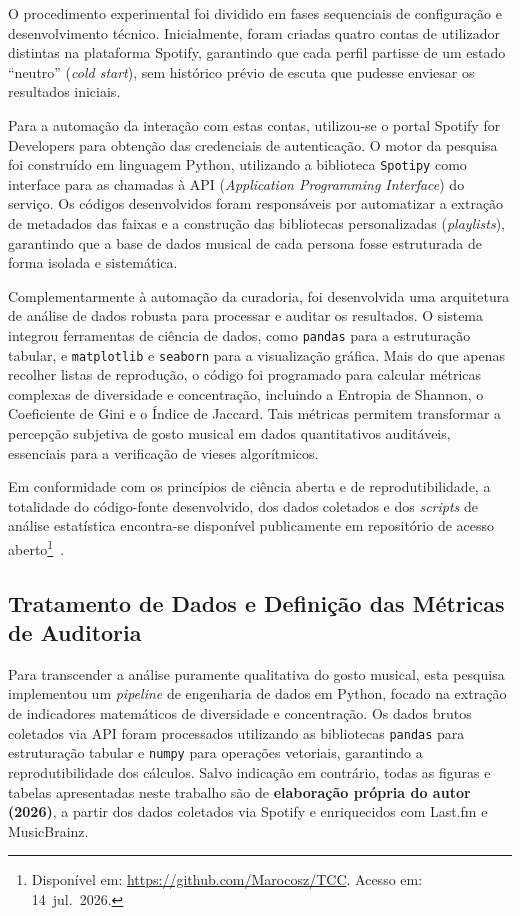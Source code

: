 \documentclass[12pt, %
openright,
oneside, %
a4paper,    %
english,   %
brazil]{facom-ufu-abntex2}
\begin{document}
O procedimento experimental foi dividido em fases sequenciais de configuração e
desenvolvimento técnico. Inicialmente, foram criadas quatro contas de utilizador
distintas na plataforma Spotify, garantindo que cada perfil partisse de um estado
``neutro'' (\emph{cold start}), sem histórico prévio de escuta que pudesse
enviesar os resultados iniciais.

Para a automação da interação com estas contas, utilizou-se o portal Spotify for
Developers para obtenção das credenciais de autenticação. O motor da pesquisa foi
construído em linguagem Python, utilizando a biblioteca \texttt{Spotipy} como
interface para as chamadas à API (\emph{Application Programming Interface}) do
serviço. Os códigos desenvolvidos foram responsáveis por automatizar a extração
de metadados das faixas e a construção das bibliotecas personalizadas
(\emph{playlists}), garantindo que a base de dados musical de cada persona fosse
estruturada de forma isolada e sistemática.

Complementarmente à automação da curadoria, foi desenvolvida uma arquitetura de
análise de dados robusta para processar e auditar os resultados. O sistema
integrou ferramentas de ciência de dados, como \texttt{pandas} para a
estruturação tabular, e \texttt{matplotlib} e \texttt{seaborn} para a
visualização gráfica. Mais do que apenas recolher listas de reprodução, o código
foi programado para calcular métricas complexas de diversidade e concentração, 
incluindo a Entropia de Shannon, o Coeficiente de Gini e o Índice de Jaccard.
Tais métricas permitem transformar a percepção subjetiva de gosto musical em
dados quantitativos auditáveis, essenciais para a verificação de vieses
algorítmicos.

Em conformidade com os princípios de ciência aberta e de reprodutibilidade, a
totalidade do código-fonte desenvolvido, dos dados coletados e dos \emph{scripts}
de análise estatística encontra-se disponível publicamente em repositório de
acesso aberto\footnote{Disponível em: \url{https://github.com/Marocosz/TCC}.
Acesso em: 14~jul.~2026.}~\cite{oliveira2026codigo}.

\subsection{Tratamento de Dados e Definição das Métricas de Auditoria}

Para transcender a análise puramente qualitativa do gosto musical, esta pesquisa
implementou um \emph{pipeline} de engenharia de dados em Python, focado na
extração de indicadores matemáticos de diversidade e concentração. Os dados
brutos coletados via API foram processados utilizando as bibliotecas
\texttt{pandas} para estruturação tabular e \texttt{numpy} para operações
vetoriais, garantindo a reprodutibilidade dos cálculos. Salvo indicação em
contrário, todas as figuras e tabelas apresentadas neste trabalho são de
\textbf{elaboração própria do autor (2026)}, a partir dos dados coletados via
Spotify e enriquecidos com Last.fm e MusicBrainz.
\end{document}
